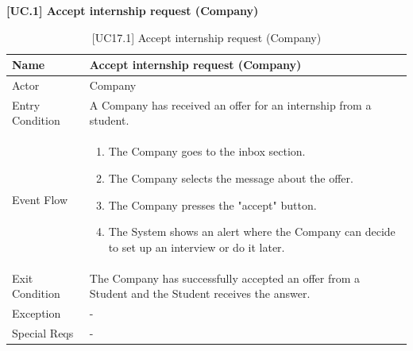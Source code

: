 \textbf{[UC\nextUseCases.1] Accept internship request (Company)}
\begin{table}[H] %
    \centering
    \begin{tabular}{|p{3cm}|p{10cm}|}
    \hline
    Name & Accept internship request (Company) \\ \hline
    Actor  & Company \\ \hline
    Entry Condition  & A Company has received an offer for an internship from a student.  \\ \hline
    Event Flow  & 
    \begin{enumerate}[noitemsep, topsep=0pt]
        \item The Company goes to the inbox section.
        \item The Company selects the message about the offer.
        \item The Company presses the "accept" button.
        \item The System shows an alert where the Company can decide to set up an interview or do it later.
    \end{enumerate}
    \\ \hline
    Exit Condition  & The Company has successfully accepted an offer from a Student and the Student receives the answer. \\ \hline
    Exception  & - \\ \hline
    Special Reqs  & - \\ \hline
    \end{tabular}
    \caption{[UC17.1] Accept internship request (Company)}
\end{table}

